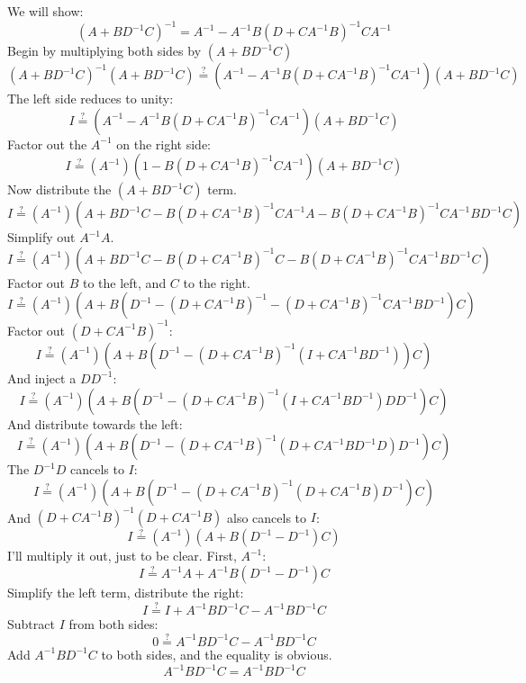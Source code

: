 \documentclass[11pt]{report}
\begin{document}
We will show:
\[ (A + BD^{-1}C)^{-1} = A^{-1} - A^{-1}B(D + CA^{-1}B)^{-1}CA^{-1} \]
Begin by multiplying both sides by $(A + BD^{-1}C)$
\[ (A + BD^{-1}C)^{-1}(A + BD^{-1}C) \overset{?}{=} (A^{-1} - A^{-1}B(D + CA^{-1}B)^{-1}CA^{-1})(A + BD^{-1}C) \]
The left side reduces to unity:
\[ I \overset{?}{=} (A^{-1} - A^{-1}B(D + CA^{-1}B)^{-1}CA^{-1})(A + BD^{-1}C) \]
Factor out the $A^{-1}$ on the right side:
\[ I \overset{?}{=} (A^{-1})
  (1 - B(D + CA^{-1}B)^{-1}CA^{-1})
  (A + BD^{-1}C)
\]
Now distribute the $(A + BD^{-1}C)$ term.
\[ I \overset{?}{=} (A^{-1})(
  A + BD^{-1}C
  - B(D + CA^{-1}B)^{-1}CA^{-1}A
  - B(D + CA^{-1}B)^{-1}CA^{-1}BD^{-1}C
)\]
Simplify out $A^{-1}A$.
\[ I \overset{?}{=} (A^{-1})(
  A + BD^{-1}C
  - B(D + CA^{-1}B)^{-1}C
  - B(D + CA^{-1}B)^{-1}CA^{-1}BD^{-1}C
)\]
Factor out $B$ to the left, and $C$ to the right.
\[ I \overset{?}{=} (A^{-1})(
  A + B(
      D^{-1}
      - (D + CA^{-1}B)^{-1}
      - (D + CA^{-1}B)^{-1}CA^{-1}BD^{-1}
      )C
)\]
Factor out $(D + CA^{-1}B)^{-1}$:
\[ I \overset{?}{=} (A^{-1})(
  A + B(
      D^{-1}
      - (D + CA^{-1}B)^{-1}
        (I + CA^{-1}BD^{-1})
      )C
)\]
And inject a $DD^{-1}$:
\[ I \overset{?}{=} (A^{-1})(
  A + B(
      D^{-1}
      - (D + CA^{-1}B)^{-1}
        (I + CA^{-1}BD^{-1})DD^{-1}
      )C
)\]
And distribute towards the left:
\[ I \overset{?}{=} (A^{-1})(
  A + B(
      D^{-1}
      - (D + CA^{-1}B)^{-1}
        (D + CA^{-1}BD^{-1}D)D^{-1}
      )C
)\]
The $D^{-1}D$ cancels to $I$:
\[ I \overset{?}{=} (A^{-1})(
  A + B(
      D^{-1}
      - (D + CA^{-1}B)^{-1}
        (D + CA^{-1}B)D^{-1}
      )C
)\]
And $(D + CA^{-1}B)^{-1}(D + CA^{-1}B)$ also cancels to $I$:
\[ I \overset{?}{=}
  (A^{-1})(A + B(D^{-1} - D^{-1})C)
\]
I'll multiply it out, just to be clear. First, $A^{-1}$:
\[ I \overset{?}{=}
  A^{-1}A + A^{-1}B(D^{-1} - D^{-1})C
\]
Simplify the left term, distribute the right:
\[ I \overset{?}{=}
  I + A^{-1}BD^{-1}C - A^{-1}BD^{-1}C
\]
Subtract $I$ from both sides:
\[ 0 \overset{?}{=}
  A^{-1}BD^{-1}C - A^{-1}BD^{-1}C
\]
Add $A^{-1}BD^{-1}C$ to both sides, and the equality is obvious.
\[ A^{-1}BD^{-1}C = A^{-1}BD^{-1}C \]





\end{document}
